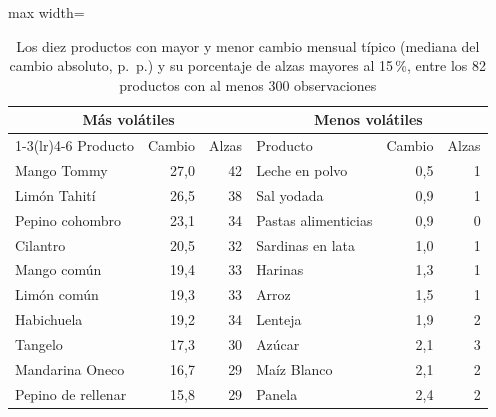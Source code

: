 \begin{table}[htbp]\centering\small
\caption{Los diez productos con mayor y menor cambio mensual típico (mediana del cambio absoluto, p.~p.) y su porcentaje de alzas mayores al 15\,\%, entre los 82 productos con al menos 300 observaciones}\label{tab:volatiles}
\begin{adjustbox}{max width=\textwidth}\begin{tabular}{lrrlrr}\toprule
\multicolumn{3}{c}{Más volátiles} & \multicolumn{3}{c}{Menos volátiles}\\ \cmidrule(lr){1-3}\cmidrule(lr){4-6}
Producto & Cambio & Alzas & Producto & Cambio & Alzas\\ \midrule
Mango Tommy & 27{,}0 & 42 & Leche en polvo & 0{,}5 & 1 \\
Limón Tahití & 26{,}5 & 38 & Sal yodada & 0{,}9 & 1 \\
Pepino cohombro & 23{,}1 & 34 & Pastas alimenticias & 0{,}9 & 0 \\
Cilantro & 20{,}5 & 32 & Sardinas en lata & 1{,}0 & 1 \\
Mango común & 19{,}4 & 33 & Harinas & 1{,}3 & 1 \\
Limón común & 19{,}3 & 33 & Arroz & 1{,}5 & 1 \\
Habichuela & 19{,}2 & 34 & Lenteja & 1{,}9 & 2 \\
Tangelo & 17{,}3 & 30 & Azúcar & 2{,}1 & 3 \\
Mandarina Oneco & 16{,}7 & 29 & Maíz Blanco & 2{,}1 & 2 \\
Pepino de rellenar & 15{,}8 & 29 & Panela & 2{,}4 & 2 \\
\bottomrule\end{tabular}\end{adjustbox}\end{table}
